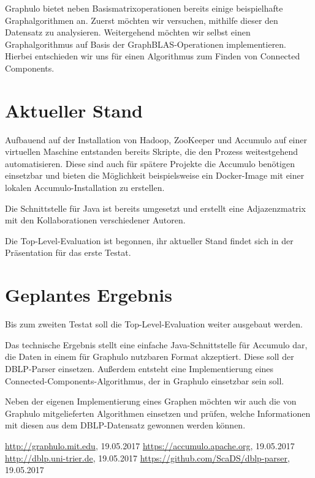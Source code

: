 \documentclass{article}
\begin{document}
Graphulo bietet neben Basismatrixoperationen bereits einige beispielhafte Graphalgorithmen an. Zuerst möchten wir versuchen, mithilfe dieser den Datensatz zu analysieren. Weitergehend möchten wir selbst einen Graphalgorithmus auf Basis der GraphBLAS-Operationen implementieren. Hierbei entschieden wir uns für einen Algorithmus zum Finden von Connected Components. 


\section{Aktueller Stand}

Aufbauend auf der Installation von Hadoop, ZooKeeper und Accumulo auf einer virtuellen Maschine entstanden bereits Skripte, die den Prozess weitestgehend automatisieren. Diese sind auch für spätere Projekte die Accumulo benötigen einsetzbar und bieten die Möglichkeit beispielsweise ein Docker-Image mit einer lokalen Accumulo-Installation zu erstellen.

Die Schnittstelle für Java ist bereits umgesetzt und erstellt eine Adjazenzmatrix mit den Kollaborationen verschiedener Autoren.

Die Top-Level-Evaluation ist begonnen, ihr aktueller Stand findet sich in der Präsentation für das erste Testat.


\section{Geplantes Ergebnis}

Bis zum zweiten Testat soll die Top-Level-Evaluation weiter ausgebaut werden.

Das technische Ergebnis stellt eine einfache Java-Schnittstelle für Accumulo dar, die Daten in einem für Graphulo nutzbaren Format akzeptiert. Diese soll der DBLP-Parser einsetzen. Außerdem entsteht eine Implementierung eines Connected-Components-Algorithmus, der in Graphulo einsetzbar sein soll.

Neben der eigenen Implementierung eines Graphen möchten wir auch die von Graphulo mitgelieferten Algorithmen einsetzen und prüfen, welche Informationen mit diesen aus dem DBLP-Datensatz gewonnen werden können.


\begin{thebibliography}{laengste Labelbreite}
	 \url{http://graphulo.mit.edu}, 19.05.2017
	 \url{https://accumulo.apache.org}, 19.05.2017
	 \url{http://dblp.uni-trier.de}, 19.05.2017
	 \url{https://github.com/ScaDS/dblp-parser}, 19.05.2017
\end{thebibliography}
\end{document}
